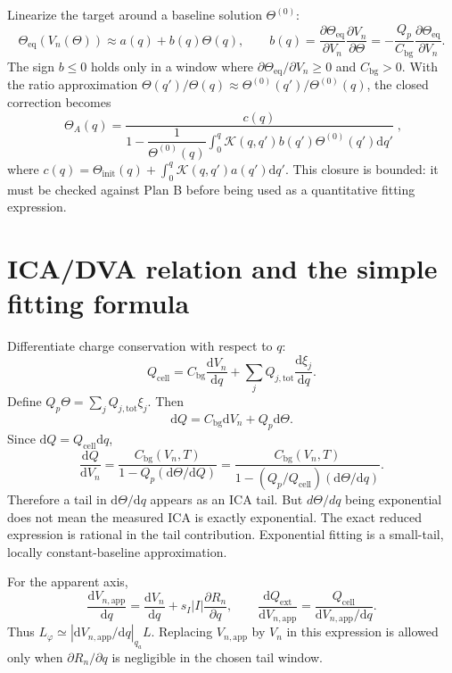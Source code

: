 \documentclass[11pt,a4paper]{article}
\newcommand{\dd}{\mathrm{d}}
\newcommand{\eq}{\mathrm{eq}}
\newcommand{\app}{\mathrm{app}}
\newcommand{\bg}{\mathrm{bg}}
\newcommand{\cell}{\mathrm{cell}}
\newcommand{\ext}{\mathrm{ext}}
\newcommand{\tot}{\mathrm{tot}}
\begin{document}
Linearize the target around a baseline solution $\Theta^{(0)}$:
\begin{equation}
\Theta_{\eq}(V_n(\Theta))\approx a(q)+b(q)\Theta(q),
\qquad
b(q)=\frac{\partial\Theta_{\eq}}{\partial V_n}\frac{\partial V_n}{\partial\Theta}
=-\frac{Q_p}{C_{\bg}}\frac{\partial\Theta_{\eq}}{\partial V_n}.
\label{eq:selfcoupling}
\end{equation}
The sign $b\le0$ holds only in a window where $\partial\Theta_{\eq}/\partial V_n\ge0$ and $C_{\bg}>0$. With the ratio approximation
$\Theta(q')/\Theta(q)\approx\Theta^{(0)}(q')/\Theta^{(0)}(q)$, the closed correction becomes
\begin{equation}
\boxed{\;\Theta_A(q)=\frac{c(q)}{1-\dfrac{1}{\Theta^{(0)}(q)}
\displaystyle\int_0^q\mathcal K(q,q')b(q')\Theta^{(0)}(q')\dd q'}\;,}
\label{eq:closed}
\end{equation}
where $c(q)=\Theta_{\mathrm{init}}(q)+\int_0^q\mathcal K(q,q')a(q')\dd q'$. This closure is bounded: it must be checked against Plan B before
being used as a quantitative fitting expression.

\section{ICA/DVA relation and the simple fitting formula}\label{sec:fiteq}
Differentiate charge conservation with respect to $q$:
\begin{equation}
Q_{\cell}=C_{\bg}\frac{\dd V_n}{\dd q}+\sum_jQ_{j,\tot}\frac{\dd\xi_j}{\dd q}.
\end{equation}
Define $Q_p\Theta=\sum_jQ_{j,\tot}\xi_j$. Then
\begin{equation}
\dd Q=C_{\bg}\dd V_n+Q_p\dd\Theta.
\label{eq:dQsplit}
\end{equation}
Since $\dd Q=Q_{\cell}\dd q$,
\begin{equation}
\boxed{\;\frac{\dd Q}{\dd V_n}=\frac{C_{\bg}(V_n,T)}{1-Q_p(\dd\Theta/\dd Q)}
=\frac{C_{\bg}(V_n,T)}{1-(Q_p/Q_{\cell})(\dd\Theta/\dd q)}.\;}
\label{eq:fiteq}
\end{equation}
Therefore a tail in $\dd\Theta/\dd q$ appears as an ICA tail. But $d\Theta/dq$ being exponential does not mean the measured ICA is exactly
exponential. The exact reduced expression is rational in the tail contribution. Exponential fitting is a small-tail, locally constant-baseline
approximation.

For the apparent axis,
\begin{equation}
\frac{\dd V_{n,\app}}{\dd q}=\frac{\dd V_n}{\dd q}+s_I|I|\frac{\partial R_n}{\partial q},
\qquad
\frac{\dd Q_{\ext}}{\dd V_{n,\app}}=\frac{Q_{\cell}}{\dd V_{n,\app}/\dd q}.
\label{eq:app_axis}
\end{equation}
Thus $L_\varphi\simeq |\dd V_{n,\app}/\dd q|_{q_a}L$. Replacing $V_{n,\app}$ by $V_n$ in this expression is allowed only when
$\partial R_n/\partial q$ is negligible in the chosen tail window.
\end{document}
